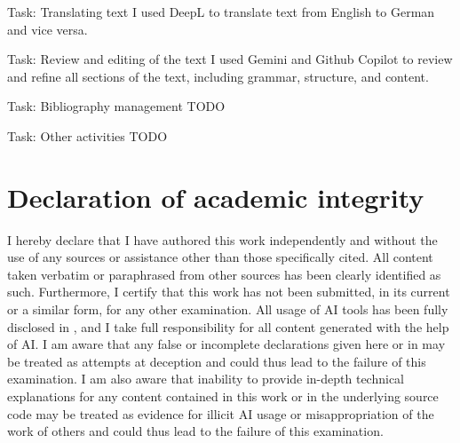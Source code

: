 \documentclass[11pt]{article}
\begin{document}
\vspace{.25em}

\begin{answerbox}{Task: Translating text}
     I used DeepL to translate text from English to German and vice versa.
\end{answerbox}

\vspace{.25em}

\begin{answerbox}{Task: Review and editing of the text}
     I used Gemini and Github Copilot to review and refine all sections of the text, including grammar, structure, and content.
\end{answerbox}

\vspace{.25em}

\begin{answerbox}{Task: Bibliography management}
     TODO
\end{answerbox}

\vspace{.25em}

\begin{answerbox}{Task: Other activities}
     TODO
\end{answerbox}


\clearpage

\section{Declaration of academic integrity}\label{sec:declaration}

I hereby declare that I have authored this work independently and without the use of any sources or assistance other than those specifically cited. All content taken verbatim or paraphrased from other sources has been clearly identified as such. Furthermore, I certify that this work has not been submitted, in its current or a similar form, for any other examination. All usage of AI tools has been fully disclosed in , and I take full responsibility for all content generated with the help of AI. I am aware that any false or incomplete declarations given here or in  may be treated as attempts at deception and could thus lead to the failure of this examination. I am also aware that inability to provide in-depth technical explanations for any content contained in this work or in the underlying source code may be treated as evidence for illicit AI usage or misappropriation of the work of others and could thus lead to the failure of this examination.

\end{document}
